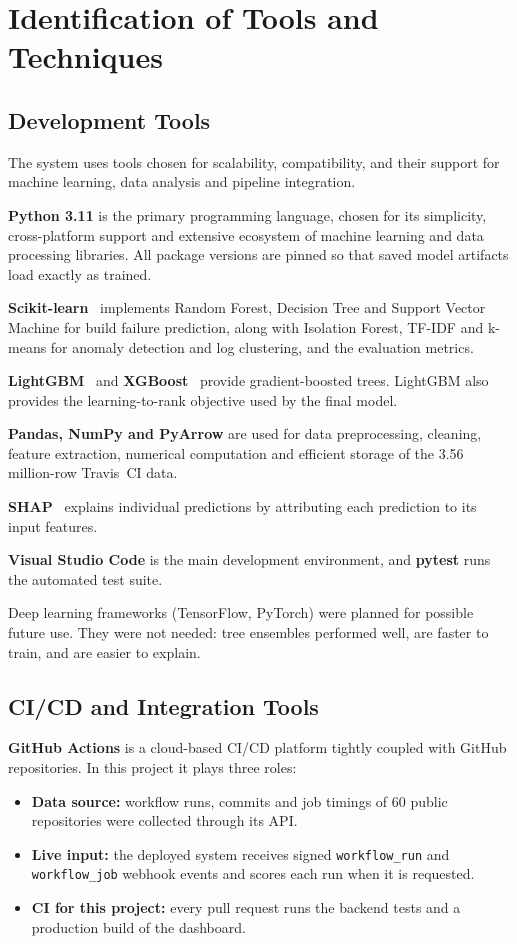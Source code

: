 \chapter{Identification of Tools and Techniques}
\label{ch:tools}

\section{Development Tools}
\label{sec:devtools}
The system uses tools chosen for scalability, compatibility, and their support for machine learning, data analysis and pipeline integration.

\textbf{Python 3.11} is the primary programming language, chosen for its simplicity, cross-platform support and extensive ecosystem of machine learning and data processing libraries. All package versions are pinned so that saved model artifacts load exactly as trained.

\textbf{Scikit-learn}~\cite{pedregosa2011scikit} implements Random Forest, Decision Tree and Support Vector Machine for build failure prediction, along with Isolation Forest, TF-IDF and k-means for anomaly detection and log clustering, and the evaluation metrics.

\textbf{LightGBM}~\cite{ke2017lightgbm} and \textbf{XGBoost}~\cite{chen2016xgboost} provide gradient-boosted trees. LightGBM also provides the learning-to-rank objective used by the final model.

\textbf{Pandas, NumPy and PyArrow} are used for data preprocessing, cleaning, feature extraction, numerical computation and efficient storage of the 3.56 million-row Travis~CI data.

\textbf{SHAP}~\cite{lundberg2017unified} explains individual predictions by attributing each prediction to its input features.

\textbf{Visual Studio Code} is the main development environment, and \textbf{pytest} runs the automated test suite.

Deep learning frameworks (TensorFlow, PyTorch) were planned for possible future use. They were not needed: tree ensembles performed well, are faster to train, and are easier to explain.

\section{CI/CD and Integration Tools}
\label{sec:citools}
\textbf{GitHub Actions} is a cloud-based CI/CD platform tightly coupled with GitHub repositories. In this project it plays three roles:
\begin{itemize}
\item \textbf{Data source:} workflow runs, commits and job timings of 60 public repositories were collected through its API.
\item \textbf{Live input:} the deployed system receives signed \texttt{workflow\_run} and \texttt{workflow\_job} webhook events and scores each run when it is requested.
\item \textbf{CI for this project:} every pull request runs the backend tests and a production build of the dashboard.
\end{itemize}


